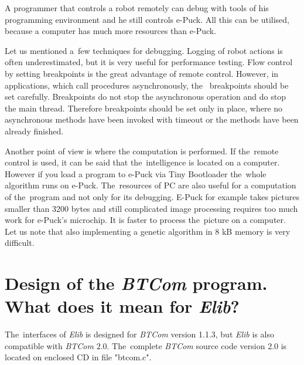   A programmer that controls a robot remotely can debug with tools of his programming environment and he still controls e-Puck.
  All this can be utilised, because a computer has much more resources than e-Puck.

  Let us mentioned a~few  techniques for debugging. 
  Logging of robot actions is often underestimated,
  but it is very useful for performance testing. 
  Flow control by setting breakpoints is the great advantage
  of remote control. However, in applications, which call procedures asynchronously, 
  the~ breakpoints should be set carefully.
  Breakpoints do not stop the asynchronous operation and do stop the main thread.
  Therefore breakpoints should be set only in place, 
  where no asynchronous methods have been invoked with timeout
  or the methods have been already finished.
  
  Another point of view is where the computation is performed.
  If the~remote control is used, it can be said that the~intelligence 
  is located on a computer. However if you load a program to e-Puck via Tiny Bootloader the~whole algorithm
  runs on e-Puck.
  The~resources of PC are also useful for a computation of the~program and not only for
  its debugging. E-Puck for example takes pictures smaller than 3200 bytes and still complicated image processing 
  requires too much work for e-Puck's microchip. It is faster to process the~picture
  on a computer. 
  Let us note that also implementing a genetic algorithm in 8 kB memory
  is very difficult.

\section{Design of the {\it BTCom} program. What does it mean for {\it Elib}?}
  \label{sec:btcomdesign}
  The~interfaces of {\it Elib} is designed for {\it BTCom} version 1.1.3, but {\it Elib} is also compatible with {\it BTCom} 2.0.
  The~complete {\it BTCom} source code version 2.0 is located on enclosed CD in file "btcom.c".

